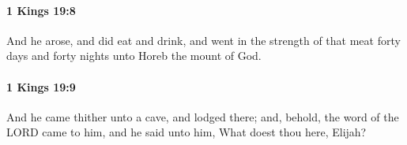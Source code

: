 		\paragraph{1 Kings 19:8} %
			\label{1KINGS-19-8}

			And he arose, and did eat and drink, and went in the strength of that meat forty days and forty nights unto Horeb the mount of God.


		\paragraph{1 Kings 19:9} %
			\label{1KINGS-19-9}

			And he came thither unto a cave, and lodged there; and, behold, the word of the LORD came to him, and he said unto him, What doest thou here, Elijah?


